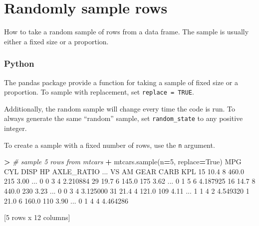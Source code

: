 \documentclass[
]{book}
\newenvironment{Shaded}{\begin{snugshade}}{\end{snugshade}}
\newcommand{\CommentTok}[1]{\textcolor[rgb]{0.56,0.35,0.01}{\textit{#1}}}
\newcommand{\DecValTok}[1]{\textcolor[rgb]{0.00,0.00,0.81}{#1}}
\newcommand{\FloatTok}[1]{\textcolor[rgb]{0.00,0.00,0.81}{#1}}
\newcommand{\NormalTok}[1]{#1}
\newcommand{\OperatorTok}[1]{\textcolor[rgb]{0.81,0.36,0.00}{\textbf{#1}}}
\newcommand{\VariableTok}[1]{\textcolor[rgb]{0.00,0.00,0.00}{#1}}
\begin{document}
\hypertarget{randomly-sample-rows}{%
\section{Randomly sample rows}\label{randomly-sample-rows}}

How to take a random sample of rows from a data frame. The sample is usually either a fixed size or a proportion.

\hypertarget{python-27}{%
\subsubsection*{Python}\label{python-27}}

The pandas package provide a function for taking a sample of fixed size or a proportion. To sample with replacement, set \texttt{replace\ =\ TRUE}.

Additionally, the random sample will change every time the code is run. To always generate the same ``random'' sample, set \texttt{random\_state} to any positive integer.

To create a sample with a fixed number of rows, use the \texttt{n} argument.

\begin{Shaded}
\begin{Highlighting}[]
\OperatorTok{\textgreater{}} \CommentTok{\# sample 5 rows from mtcars}
\OperatorTok{+}\NormalTok{ mtcars.sample(n}\OperatorTok{=}\DecValTok{5}\NormalTok{, replace}\OperatorTok{=}\VariableTok{True}\NormalTok{)}
\NormalTok{     MPG  CYL   DISP   HP  AXLE\_RATIO  ...  VS  AM  GEAR CARB       KPL}
\DecValTok{15}  \FloatTok{10.4}    \DecValTok{8}  \FloatTok{460.0}  \DecValTok{215}        \FloatTok{3.00}\NormalTok{  ...   }\DecValTok{0}   \DecValTok{0}     \DecValTok{3}    \DecValTok{4}  \FloatTok{2.210884}
\DecValTok{29}  \FloatTok{19.7}    \DecValTok{6}  \FloatTok{145.0}  \DecValTok{175}        \FloatTok{3.62}\NormalTok{  ...   }\DecValTok{0}   \DecValTok{1}     \DecValTok{5}    \DecValTok{6}  \FloatTok{4.187925}
\DecValTok{16}  \FloatTok{14.7}    \DecValTok{8}  \FloatTok{440.0}  \DecValTok{230}        \FloatTok{3.23}\NormalTok{  ...   }\DecValTok{0}   \DecValTok{0}     \DecValTok{3}    \DecValTok{4}  \FloatTok{3.125000}
\DecValTok{31}  \FloatTok{21.4}    \DecValTok{4}  \FloatTok{121.0}  \DecValTok{109}        \FloatTok{4.11}\NormalTok{  ...   }\DecValTok{1}   \DecValTok{1}     \DecValTok{4}    \DecValTok{2}  \FloatTok{4.549320}
\DecValTok{1}   \FloatTok{21.0}    \DecValTok{6}  \FloatTok{160.0}  \DecValTok{110}        \FloatTok{3.90}\NormalTok{  ...   }\DecValTok{0}   \DecValTok{1}     \DecValTok{4}    \DecValTok{4}  \FloatTok{4.464286}

\NormalTok{[}\DecValTok{5}\NormalTok{ rows x }\DecValTok{12}\NormalTok{ columns]}
\end{Highlighting}
\end{Shaded}
\end{document}
